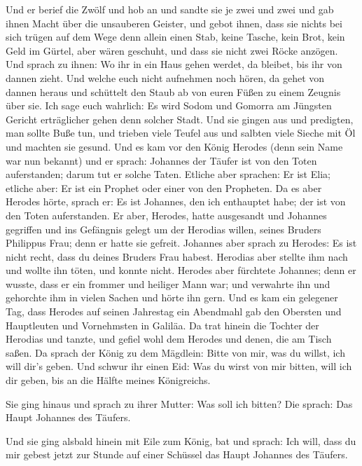  Und er berief die Zwölf und hob an und sandte sie je zwei
und zwei und gab ihnen Macht über die unsauberen Geister, 
und gebot ihnen, dass sie nichts bei sich trügen auf dem Wege denn
allein einen Stab, keine Tasche, kein Brot, kein Geld im Gürtel,
 aber wären geschuht, und dass sie nicht zwei Röcke
anzögen.  Und sprach zu ihnen: Wo ihr in ein Haus gehen
werdet, da bleibet, bis ihr von dannen zieht.  Und welche
euch nicht aufnehmen noch hören, da gehet von dannen heraus und
schüttelt den Staub ab von euren Füßen zu einem Zeugnis über sie. Ich
sage euch wahrlich: Es wird Sodom und Gomorra am Jüngsten Gericht
erträglicher gehen denn solcher Stadt.  Und sie gingen
aus und predigten, man sollte Buße tun,  und trieben
viele Teufel aus und salbten viele Sieche mit Öl und machten sie gesund.
 Und es kam vor den König Herodes (denn sein Name war nun
bekannt) und er sprach: Johannes der Täufer ist von den Toten
auferstanden; darum tut er solche Taten.  Etliche aber
sprachen: Er ist Elia; etliche aber: Er ist ein Prophet oder einer von
den Propheten.  Da es aber Herodes hörte, sprach er: Es
ist Johannes, den ich enthauptet habe; der ist von den Toten
auferstanden.  Er aber, Herodes, hatte ausgesandt und
Johannes gegriffen und ins Gefängnis gelegt um der Herodias willen,
seines Bruders Philippus Frau; denn er hatte sie gefreit.
 Johannes aber sprach zu Herodes: Es ist nicht recht,
dass du deines Bruders Frau habest.  Herodias aber
stellte ihm nach und wollte ihn töten, und konnte nicht. 
Herodes aber fürchtete Johannes; denn er wusste, dass er ein frommer und
heiliger Mann war; und verwahrte ihn und gehorchte ihm in vielen Sachen
und hörte ihn gern.  Und es kam ein gelegener Tag, dass
Herodes auf seinen Jahrestag ein Abendmahl gab den Obersten und
Hauptleuten und Vornehmsten in Galiläa.  Da trat hinein
die Tochter der Herodias und tanzte, und gefiel wohl dem Herodes und
denen, die am Tisch saßen. Da sprach der König zu dem Mägdlein: Bitte
von mir, was du willst, ich will dir's geben.  Und schwur
ihr einen Eid: Was du wirst von mir bitten, will ich dir geben, bis an
die Hälfte meines Königreichs.

 Sie ging hinaus und sprach zu ihrer Mutter: Was soll ich
bitten? Die sprach: Das Haupt Johannes des Täufers.

 Und sie ging alsbald hinein mit Eile zum König, bat und
sprach: Ich will, dass du mir gebest jetzt zur Stunde auf einer Schüssel
das Haupt Johannes des Täufers.

